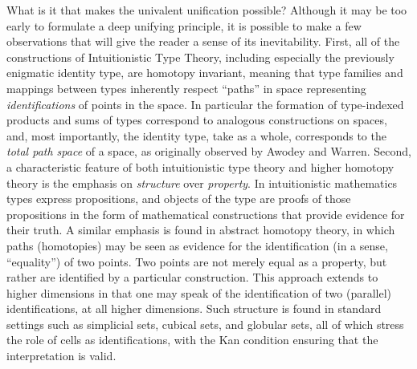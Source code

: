 \documentclass[11pt]{article}
\theoremstyle{remark}
\theoremstyle{definition}
\begin{document}
What is it that makes the univalent unification possible?  Although it may be too early to formulate a deep unifying principle, it is possible to make a few observations that will give the reader a sense of its inevitability.  First, all of the constructions of Intuitionistic Type Theory, including especially the previously enigmatic identity type, are homotopy invariant, meaning that type families and mappings between types inherently respect ``paths'' in space representing \emph{identifications} of points in the space.  In particular the formation of type-indexed products and sums of types correspond to analogous constructions on spaces, and, most importantly, the identity type, take as a whole, corresponds to the \emph{total path space} of a space, as originally observed by Awodey and Warren.  Second, a characteristic feature of both intuitionistic type theory and higher homotopy theory is the emphasis on \emph{structure} over \emph{property}.  In intuitionistic mathematics types express propositions, and objects of the type are proofs of those propositions in the form of mathematical constructions that provide evidence for their truth.  A similar emphasis is found in abstract homotopy theory, in which paths (homotopies) may be seen as evidence for the identification (in a sense, ``equality'') of two points.  Two points are not merely equal as a property, but rather are identified by a particular construction.  This approach extends to higher dimensions in that one may speak of the identification of two (parallel) identifications, at all higher dimensions.  Such structure is found in standard settings such as simplicial sets, cubical sets, and globular sets, all of which stress the role of cells as identifications, with the Kan condition ensuring that the interpretation is valid.
\end{document}
